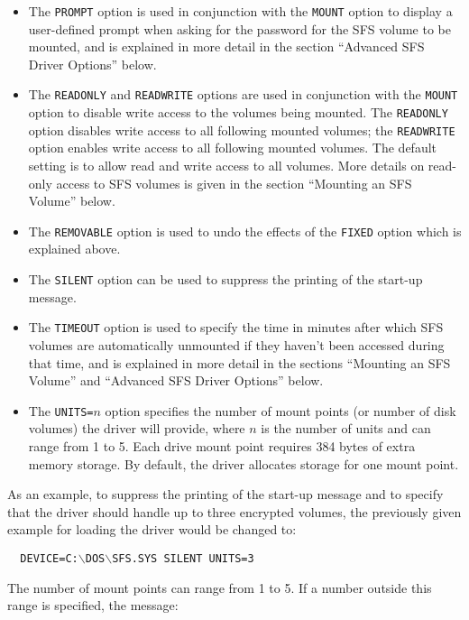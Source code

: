 \begin{itemize}
\item The {\tt PROMPT} option is used in conjunction with the {\tt MOUNT} option to display a
  user-defined prompt when asking for the password for the SFS volume to be 
  mounted, and is explained in more detail in the section ``Advanced SFS Driver
  Options'' below.

\item The {\tt READONLY} and {\tt READWRITE} options are used in conjunction with the {\tt MOUNT}
  option to disable write access to the volumes being mounted. The {\tt READONLY}
  option disables write access to all following mounted volumes; the {\tt READWRITE}
  option enables write access to all following mounted volumes.  The default
  setting is to allow read and write access to all volumes.
  More details on read-only access to SFS volumes is given in the section ``Mounting an SFS
  Volume'' below.

\item The {\tt REMOVABLE} option is used to undo the effects of the {\tt FIXED} option which is
  explained above.


\item The {\tt SILENT} option can be used to suppress the printing of the start-up
  message.

\item The {\tt TIMEOUT} option is used to specify the time in minutes after which SFS
  volumes are automatically unmounted if they haven't been accessed during that
  time, and is explained in more detail in the sections ``Mounting an SFS
  Volume'' and ``Advanced SFS Driver Options'' below.

\item The {\tt UNITS=$n$} option specifies the number of mount points (or number of disk
  volumes) the driver will provide, where $n$ is the number of units and can
  range from 1 to 5.  Each drive mount point requires 384 bytes of extra memory
  storage.  By default, the driver allocates storage for one mount point.

\end{itemize}

As an example, to suppress the printing of the start-up message and to specify
that the driver should handle up to three encrypted volumes, the previously
given example for loading the driver would be changed to:

{\tt \verb|  |DEVICE=C:$\backslash$DOS$\backslash$SFS.SYS SILENT UNITS=3}

The number of mount points can range from 1 to 5.  If a number outside this
range is specified, the message:

